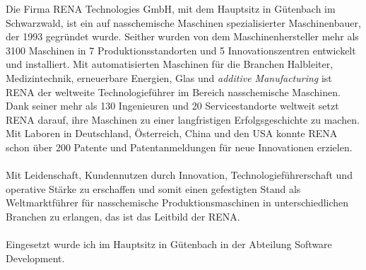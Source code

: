 
Die Firma RENA Technologies GmbH, mit dem Hauptsitz in Gütenbach im Schwarzwald, ist ein auf nasschemische Maschinen spezialisierter Maschinenbauer, der 1993 gegründet wurde. Seither wurden von dem Maschinenhersteller mehr als 3100 Maschinen in 7 Produktionsstandorten und 5 Innovationszentren entwickelt und installiert. Mit automatisierten Maschinen für die Branchen Halbleiter, Medizintechnik, erneuerbare Energien, Glas und \textit{additive Manufacturing} ist RENA der weltweite Technologieführer im Bereich nasschemische Maschinen. Dank seiner mehr als 130 Ingenieuren und 20 Servicestandorte weltweit setzt RENA darauf, ihre Maschinen zu einer langfristigen Erfolgsgeschichte zu machen. Mit Laboren in Deutschland, Österreich, China und den USA konnte RENA schon über 200 Patente und Patentanmeldungen für neue Innovationen erzielen. 
\ \\
\ \\
\glqq Mit Leidenschaft, Kundennutzen durch Innovation, Technologieführerschaft und operative Stärke zu erschaffen und somit einen gefestigten Stand als Weltmarktführer für nasschemische Produktionsmaschinen in unterschiedlichen Branchen zu erlangen\grqq{}, das ist das Leitbild der RENA.
\ \\
\ \\
Eingesetzt wurde ich im Hauptsitz in Gütenbach in der Abteilung Software Development.